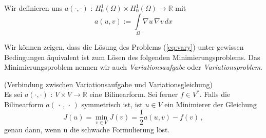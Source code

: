 Wir definieren uns $a( \cdot , \cdot )$ : $H^1_0 (\Omega) \times H^1_0(\Omega) \rightarrow \mathbb{R}$ mit
\begin{equation*}
a(u,v) := \int\limits_{\Omega} \nabla u \, \nabla v \, dx
\end{equation*}

Wir können zeigen, dass die Lösung des Problems (\ref{eq:vary}) unter gewissen Bedingungen äquivalent ist zum Lösen des folgenden Minimierungsproblems. Das Minimierungsproblem nennen wir auch \textit{Variationsaufgabe} oder \textit{Variationsproblem}.

\begin{Satz} (Verbindung zwischen Variationsaufgabe und Variationsgleichung) \\
Es sei $a( \cdot , \cdot )$ : $ V \times V \rightarrow \mathbb{R} $ eine Bilinearform. Sei ferner $f \in V^{*}$.
Falls die Bilinearform $a(\, \cdot \, , \, \cdot \, )$ symmetrisch ist, ist $u \in V$ ein Minimierer der Gleichung
\begin{equation} \label{eq:mini}
J(u) = \min_{v \in V} J(v) = \dfrac{1}{2} a(u,v) - f(v) \, ,
\end{equation}
genau dann, wenn u die schwache Formulierung löst.
\end{Satz}



